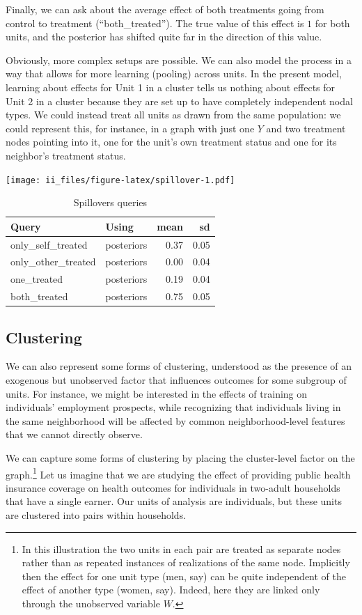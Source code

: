 \documentclass[
  12pt,
]{book}
\begin{document}
Finally, we can ask about the average effect of both treatments going from control to treatment (``both\_treated''). The true value of this effect is \(1\) for both units, and the posterior has shifted quite far in the direction of this value.

Obviously, more complex setups are possible. We can also model the process in a way that allows for more learning (pooling) across units. In the present model, learning about effects for Unit 1 in a cluster tells us nothing about effects for Unit 2 in a cluster because they are set up to have completely independent nodal types. We could instead treat all units as drawn from the same population: we could represent this, for instance, in a graph with just one \(Y\) and two treatment nodes pointing into it, one for the unit's own treatment status and one for its neighbor's treatment status.

\texttt{[image: ii\_files/figure-latex/spillover-1.pdf]}

\begin{table}

\caption{\label{tab:spillover}Spillovers queries}
\centering
\begin{tabular}[t]{l|l|r|r}
\hline
Query & Using & mean & sd\\
\hline
only\_self\_treated & posteriors & 0.37 & 0.05\\
\hline
only\_other\_treated & posteriors & 0.00 & 0.04\\
\hline
one\_treated & posteriors & 0.19 & 0.04\\
\hline
both\_treated & posteriors & 0.75 & 0.05\\
\hline
\end{tabular}
\end{table}

\hypertarget{clustering}{%
\subsection{Clustering}\label{clustering}}

We can also represent some forms of clustering, understood as the presence of an exogenous but unobserved factor that influences outcomes for some subgroup of units. For instance, we might be interested in the effects of training on individuals' employment prospects, while recognizing that individuals living in the same neighborhood will be affected by common neighborhood-level features that we cannot directly observe.

We can capture some forms of clustering by placing the cluster-level factor on the graph.\footnote{In this illustration the two units in each pair are treated as separate nodes rather than as repeated instances of realizations of the same node. Implicitly then the effect for one unit type (men, say) can be quite independent of the effect of another type (women, say). Indeed, here they are linked only through the unobserved variable \(W\).} Let us imagine that we are studying the effect of providing public health insurance coverage on health outcomes for individuals in two-adult households that have a single earner. Our units of analysis are individuals, but these units are clustered into pairs within households.
\end{document}
